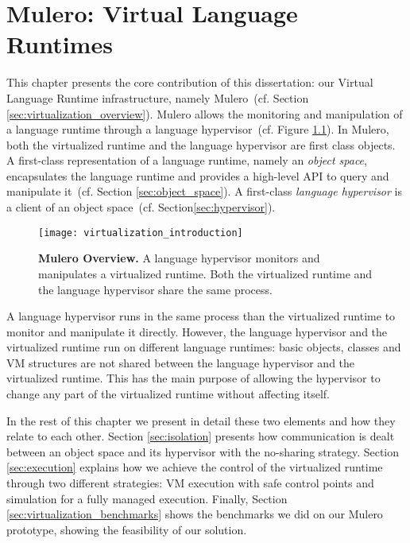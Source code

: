 
\newcommand{\VTT}{Mulero\xspace}
\newcommand{\Vtt}{\VTT}
\newcommand{\VT}{\VTT}
\newcommand{\Vt}{\VTT}

\chapter{\VTT: Virtual Language Runtimes}
\minitoc
\introduction

This chapter presents the core contribution of this dissertation: our Virtual Language Runtime infrastructure, namely \VTT~(cf. Section \ref{sec:virtualization_overview}). \VTT allows the monitoring and manipulation of a language runtime through a language hypervisor~(cf. Figure \ref{fig:virtualization_introduction}). In \VTT, both the virtualized runtime and the language hypervisor are first class objects. A first-class representation of a language runtime, namely an \emph{object space}, encapsulates the language runtime and provides a high-level API to query and manipulate it~(cf. Section \ref{sec:object_space}). A first-class \emph{language hypervisor} is a client of an object space~(cf. Section\ref{sec:hypervisor}).

\begin{figure}[htb]
\begin{center}
\texttt{[image: virtualization\_introduction]}
\caption{\textbf{\VTT Overview.} A language hypervisor monitors and manipulates a virtualized runtime. Both the virtualized runtime and the language hypervisor share the same process.\label{fig:virtualization_introduction}}
\end{center}
\end{figure}

A language hypervisor runs in the same process than the virtualized runtime to monitor and manipulate it directly. However, the language hypervisor and the virtualized runtime run on different language runtimes: basic objects, classes and VM structures are not shared between the language hypervisor and the virtualized runtime. This has the main purpose of allowing the hypervisor to change any part of the virtualized runtime without affecting itself.

In the rest of this chapter we present in detail these two elements and how they relate to each other. Section \ref{sec:isolation} presents how communication is dealt between an object space and its hypervisor with the no-sharing strategy. Section \ref{sec:execution} explains how we achieve the control of the virtualized runtime through two different strategies: VM execution with safe control points and simulation for a fully managed execution. Finally, Section \ref{sec:virtualization_benchmarks} shows the benchmarks we did on our \Vtt prototype, showing the feasibility of our solution.

